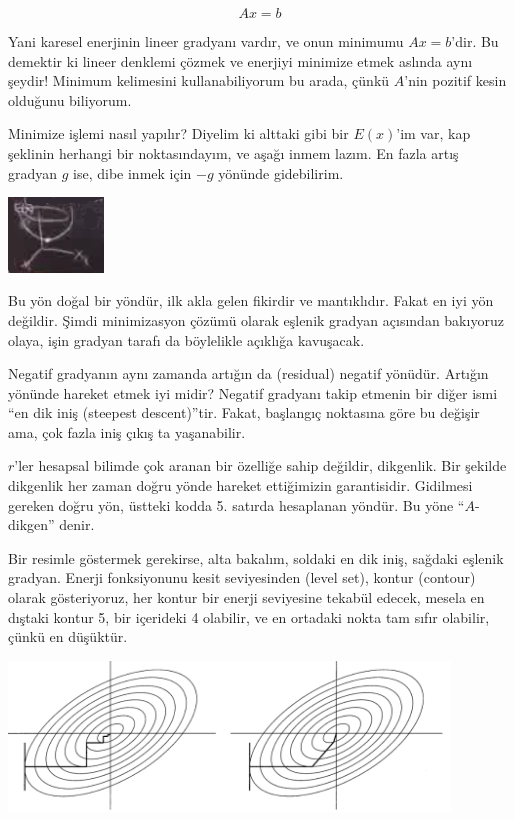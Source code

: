\documentclass[12pt,fleqn]{article}\usepackage{../../common}
\begin{document}
$$ Ax = b $$

Yani karesel enerjinin lineer gradyanı vardır, ve onun minimumu $Ax = b$'dir. Bu
demektir ki lineer denklemi çözmek ve enerjiyi minimize etmek aslında aynı
şeydir! Minimum kelimesini kullanabiliyorum bu arada, çünkü $A$'nin pozitif
kesin olduğunu biliyorum.

Minimize işlemi nasıl yapılır? Diyelim ki alttaki gibi bir $E(x)$'im var,
kap şeklinin herhangi bir noktasındayım, ve aşağı inmem lazım. En fazla
artış gradyan $g$ ise, dibe inmek için $-g$ yönünde gidebilirim. 

\includegraphics[height=2cm]{19_1.png}

Bu yön doğal bir yöndür, ilk akla gelen fikirdir ve mantıklıdır. Fakat en
iyi yön değildir. Şimdi minimizasyon çözümü olarak eşlenik gradyan
açısından bakıyoruz olaya, işin gradyan tarafı da böylelikle açıklığa
kavuşacak. 

Negatif gradyanın aynı zamanda artığın da (residual) negatif
yönüdür. Artığın yönünde hareket etmek iyi midir? Negatif gradyanı takip
etmenin bir diğer ismi ``en dik iniş (steepest descent)''tir. Fakat,
başlangıç noktasına göre bu değişir ama, çok fazla iniş çıkış ta
yaşanabilir.

$r$'ler hesapsal bilimde çok aranan bir özelliğe sahip değildir,
dikgenlik. Bir şekilde dikgenlik her zaman doğru yönde hareket
ettiğimizin garantisidir. Gidilmesi gereken doğru yön, üstteki kodda
5. satırda hesaplanan yöndür. Bu yöne ``$A$-dikgen'' denir. 

Bir resimle göstermek gerekirse, alta bakalım, soldaki en dik iniş, sağdaki
eşlenik gradyan. Enerji fonksiyonunu kesit seviyesinden (level set), kontur
(contour) olarak gösteriyoruz, her kontur bir enerji seviyesine tekabül edecek,
mesela en dıştaki kontur 5, bir içerideki 4 olabilir, ve en ortadaki nokta tam
sıfır olabilir, çünkü en düşüktür.

\includegraphics[height=4cm]{19_2.png}
\end{document}
